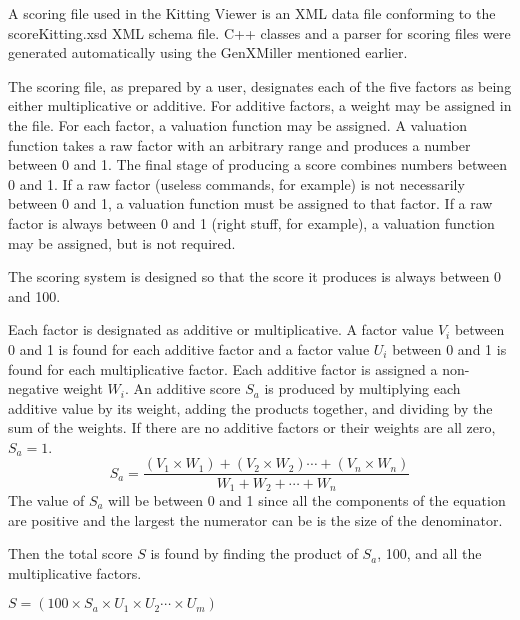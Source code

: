 A scoring file used in the Kitting Viewer is an XML data file conforming to
the scoreKitting.xsd XML schema file. C++ classes and a parser for scoring
files were generated automatically using the GenXMiller mentioned earlier.

The scoring file, as prepared by a user, designates each of the five
factors as being either multiplicative or additive. For additive factors, a
weight may be assigned in the file. For each factor, a valuation function
may be assigned. A valuation function takes a raw factor with an arbitrary
range and produces a number between 0 and 1. The final stage of producing
a score combines numbers between 0 and 1. If a raw factor (useless
commands, for example) is not necessarily between 0 and 1, a valuation
function must be assigned to that factor. If a raw factor is always between
0 and 1 (right stuff, for example), a valuation function may be assigned,
but is not required.

The scoring system is designed so that the score it produces is always
between 0 and 100.

Each factor is designated as additive or multiplicative. A factor
value $V_i$ between 0 and 1 is found for each additive factor and a
factor value $U_i$ between 0 and 1 is found for each multiplicative
factor. Each additive factor is assigned a non-negative weight $W_i$. An
additive score $S_a$ is produced by multiplying each additive value by
its weight, adding the products together, and dividing by the sum of the
weights. If there are no additive factors or their weights are all
zero, $S_a = 1$.
\[
S_a = \frac{(V_1\times W_1)+(V_2\times W_2)\cdots + (V_n\times W_n)}{W_1+W_2+\cdots+W_n}
\]
The value of $S_a$ will be between 0 and 1 since all the components of the
equation are positive and the largest the numerator can be is the size
of the denominator.

Then the total score $S$ is found by finding the product of $S_a$, 100, and
all the multiplicative factors.

$S = (100\times S_a\times U_1\times U_2\cdots \times U_m)$



